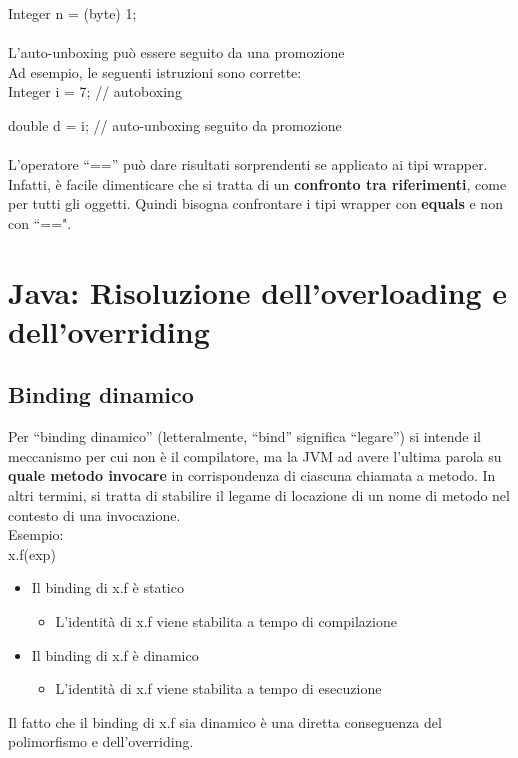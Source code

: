 \documentclass[10pt]{article}
\begin{document}
Integer n = (byte) 1;\\\\
L'auto-unboxing può essere seguito da una promozione\\
Ad esempio, le seguenti istruzioni sono corrette:\\

Integer i = 7; // autoboxing

double d = i; // auto-unboxing seguito da promozione\\\\
L'operatore “==” può dare risultati sorprendenti se applicato ai tipi wrapper.
Infatti, è facile dimenticare che si tratta di un \textbf{confronto tra riferimenti}, come per tutti gli oggetti. Quindi bisogna confrontare i tipi wrapper con \textbf{equals} e non con “==".

\section{Java: Risoluzione dell'overloading e dell'overriding}
\subsection{Binding dinamico}
Per “binding dinamico” (letteralmente, “bind” significa “legare”) si intende il meccanismo per cui non è il compilatore, ma la JVM ad avere l'ultima parola su \textbf{quale metodo invocare} in corrispondenza di ciascuna chiamata a metodo.
In altri termini, si tratta di stabilire il legame di locazione di un nome di metodo nel contesto di una invocazione.\\
Esempio:\\

x.f(exp)
\begin{itemize}
    \item Il binding di x.f è statico
    \begin{itemize}
        \item L’identità di x.f viene stabilita a tempo di compilazione
    \end{itemize}
    \item Il binding di x.f è dinamico
    \begin{itemize}
        \item L’identità di x.f viene stabilita a tempo di esecuzione
    \end{itemize}
\end{itemize}
Il fatto che il binding di x.f sia dinamico è una diretta conseguenza del polimorfismo e dell'overriding. 
\end{document}

